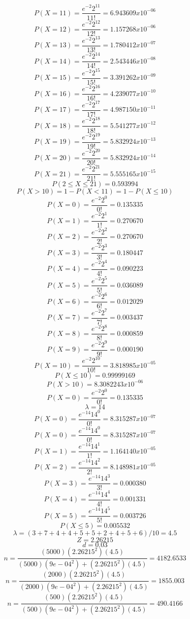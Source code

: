 $$P(X=11)=\frac{e^{-2}2^{11}}{11!}=6.943609 x10^{-06}$$
$$P(X=12)=\frac{e^{-2}2^{12}}{12!}=1.157268 x10^{-06}$$
$$P(X=13)=\frac{e^{-2}2^{13}}{13!}=1.780412 x10^{-07}$$
$$P(X=14)=\frac{e^{-2}2^{14}}{14!}=2.543446 x10^{-08}$$
$$P(X=15)=\frac{e^{-2}2^{15}}{15!}=3.391262 x10^{-09}$$
$$P(X=16)=\frac{e^{-2}2^{16}}{16!}=4.239077 x10^{-10}$$
$$P(X=17)=\frac{e^{-2}2^{17}}{17!}=4.987150 x10^{-11}$$
$$P(X=18)=\frac{e^{-2}2^{18}}{18!}=5.541277 x10^{-12}$$
$$P(X=19)=\frac{e^{-2}2^{19}}{19!}=5.832924 x10^{-13}$$
$$P(X=20)=\frac{e^{-2}2^{20}}{20!}=5.832924 x10^{-14}$$
$$P(X=21)=\frac{e^{-2}2^{21}}{21!}=5.555165 x10^{-15}$$
$$P(2\leq X \leq21)=0.593994$$
$$P(X>10)=1-P(X<11)=1-P(X\leq10)$$
$$P(X=0)=\frac{e^{-2}2^{0}}{0!}=0.135335$$
$$P(X=1)=\frac{e^{-2}2^{1}}{1!}=0.270670$$
$$P(X=2)=\frac{e^{-2}2^{2}}{2!}=0.270670$$
$$P(X=3)=\frac{e^{-2}2^{3}}{3!}=0.180447$$
$$P(X=4)=\frac{e^{-2}2^{4}}{4!}=0.090223$$
$$P(X=5)=\frac{e^{-2}2^{5}}{5!}=0.036089$$
$$P(X=6)=\frac{e^{-2}2^{6}}{6!}=0.012029$$
$$P(X=7)=\frac{e^{-2}2^{7}}{7!}=0.003437$$
$$P(X=8)=\frac{e^{-2}2^{8}}{8!}=0.000859$$
$$P(X=9)=\frac{e^{-2}2^{9}}{9!}=0.000190$$
$$P(X=10)=\frac{e^{-2}2^{10}}{10!}=3.818985 x10^{-05}$$
$$P(X\leq10)=0.99999169$$
$$P(X>10)=8.3082243 x10^{-06}$$
$$P(X=0)=\frac{e^{-2}2^{0}}{0!}=0.135335$$
$$\lambda=14$$
$$P(X=0)=\frac{e^{-14}14^{0}}{0!}=8.315287 x10^{-07}$$
$$P(X=0)=\frac{e^{-14}14^{0}}{0!}=8.315287 x10^{-07}$$
$$P(X=1)=\frac{e^{-14}14^{1}}{1!}=1.164140 x10^{-05}$$
$$P(X=2)=\frac{e^{-14}14^{2}}{2!}=8.148981 x10^{-05}$$
$$P(X=3)=\frac{e^{-14}14^{3}}{3!}=0.000380$$
$$P(X=4)=\frac{e^{-14}14^{4}}{4!}=0.001331$$
$$P(X=5)=\frac{e^{-14}14^{5}}{5!}=0.003726$$
$$P(X\leq5)=0.005532$$
$$\lambda=(3+7+4+4+5+5+2+4+5+6)/10=4.5$$
$$Z=2.26215$$
$$d=0.03$$
$$n=\frac{(5000)(2.26215^{2})(4.5)}{(5000)(9e-04^{2})+(2.26215^{2})(4.5)}=4182.6533$$
$$n=\frac{(2000)(2.26215^{2})(4.5)}{(2000)(9e-04^{2})+(2.26215^{2})(4.5)}=1855.003$$
$$n=\frac{(500)(2.26215^{2})(4.5)}{(500)(9e-04^{2})+(2.26215^{2})(4.5)}=490.4166$$